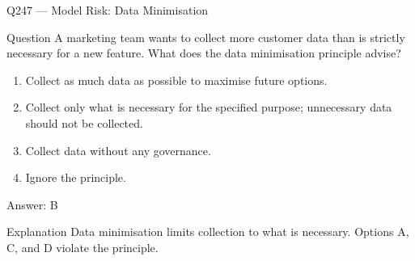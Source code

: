 \documentclass[aspectratio=169,8pt]{beamer}
\begin{document}
																																	\begin{frame}{Q247 --- Model Risk: Data Minimisation}
																																		\begin{block}{Question}
																																			A marketing team wants to collect more customer data than is strictly necessary for a new feature. What does the data minimisation principle advise?
																																			\begin{enumerate}
																																				\item Collect as much data as possible to maximise future options.
																																				\item Collect only what is necessary for the specified purpose; unnecessary data should not be collected.
																																				\item Collect data without any governance.
																																				\item Ignore the principle.
																																			\end{enumerate}  \end{block}
																																			\begin{exampleblock}{Answer: B}\end{exampleblock}
																																			\begin{block}{Explanation}
																																				Data minimisation limits collection to what is necessary. Options A, C, and D violate the principle.
																																			\end{block}
																																		\end{frame}
																																		
\end{document}
